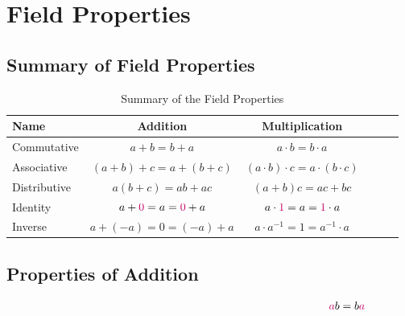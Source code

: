 \documentclass[20150903-160354-rs2.2-MarksMathNotebook.tex]{subfiles}
\begin{document}
%
%

\chapter{Field Properties}

\section{Summary of Field Properties}

\begin{table}[h]
\begin{tabular}{|l|c|c|c|c|c}
\hline
Name 								& Addition 	                & Multiplication  \\
\hline
Commutative							& $a+b=b+a$		            & $a \cdot b = b \cdot a$   \\
\hline
Associative						    & $(a+b)+c = a+(b+c)$ 		& $(a \cdot b) \cdot c = a \cdot(b \cdot c)$ \\
\hline
Distributive	                   &  $a(b+c)=ab+ac$            & $(a+b)c=ac+bc$ \\
\hline
Identity 	                       & $a + \cRed{0} = a = \cRed{0}+a$		        & $a \cdot \cRed{1} = a = \cRed{1} \cdot a$ \\
\hline
Inverse                            & $a + (-a) = 0 = (-a)+a$             & $a \cdot a^{-1}=1 = a^{-1} \cdot a$ \\
\hline
\end{tabular}
\caption{Summary of the Field Properties}\label{tab:tableoffieldproperties}
\end{table}


\section{Properties of Addition}

\begin{definition}

\begin{align}
\alert{a}b &= b\alert{a} \label{eq:cpa}
\end{align}
\end{definition}
\end{document}
